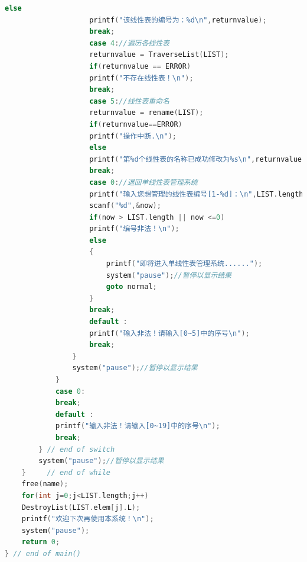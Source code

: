 \documentclass[supercite]{Experimental_Report}
\theoremstyle{definition}
\begin{document}
\begin{lstlisting}[language=C]
					else
					printf("该线性表的编号为：%d\n",returnvalue);
					break;
					case 4://遍历各线性表 
					returnvalue = TraverseList(LIST);
					if(returnvalue == ERROR)
					printf("不存在线性表！\n");
					break;
					case 5://线性表重命名 
					returnvalue = rename(LIST);
					if(returnvalue==ERROR)
					printf("操作中断.\n");
					else
					printf("第%d个线性表的名称已成功修改为%s\n",returnvalue,LIST.elem[returnvalue-1].name);
					break;
					case 0://退回单线性表管理系统 
					printf("输入您想管理的线性表编号[1-%d]：\n",LIST.length);
					scanf("%d",&now);
					if(now > LIST.length || now <=0)
					printf("编号非法！\n"); 
					else
					{
						printf("即将进入单线性表管理系统......");
						system("pause");//暂停以显示结果
						goto normal;
					} 
					break;
					default :
					printf("输入非法！请输入[0~5]中的序号\n");
					break; 
				}
				system("pause");//暂停以显示结果
			}
			case 0:
			break;
			default :
			printf("输入非法！请输入[0~19]中的序号\n");
			break; 
		} // end of switch
		system("pause");//暂停以显示结果
	}     // end of while
	free(name); 
	for(int j=0;j<LIST.length;j++)
	DestroyList(LIST.elem[j].L);
	printf("欢迎下次再使用本系统！\n");
	system("pause");
	return 0;
} // end of main()
\end{lstlisting}
\newpage
\end{document}
